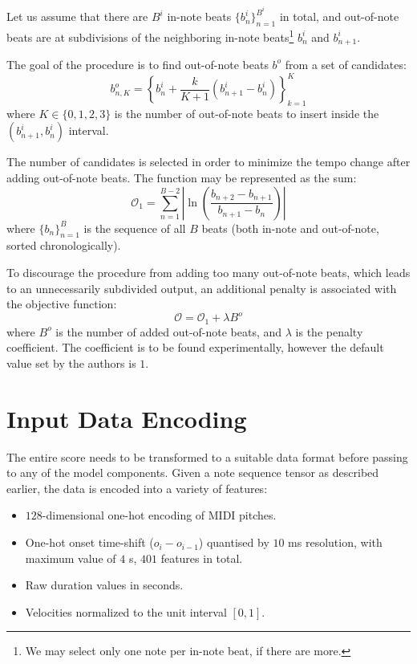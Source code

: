Let us assume that there are $B^i$ in-note beats $\{b_n^i\}_{n=1}^{B^i}$ in total, and out-of-note beats are at subdivisions of the neighboring in-note beats\footnote{We may select only one note per in-note beat, if there are more.} $b_{n}^i$ and $b_{n+1}^i$.

The goal of the procedure is to find out-of-note beats $b^o$ from a set of candidates: \begin{equation}\label{out_of_note_candidates}
b_{n,K}^o = \left\{b_n^i + \frac{k}{K+1}\left(b_{n+1}^i-b_n^i\right)\right\}_{k=1}^K
\end{equation} where $K\in\{0,1,2,3\}$ is the number of out-of-note beats to insert inside the $\left(b_{n+1}^i, b_n^i\right)$ interval.

The number of candidates is selected in order to minimize the tempo change after adding out-of-note beats. The function may be represented as the sum: \[\mathcal{O}_1 = \sum_{n=1}^{B-2}\left|\ln\left(\frac{b_{n+2} - b_{n+1}}{b_{n+1} - b_n}\right)\right|\] where $\{b_n\}_{n=1}^B$ is the sequence of all $B$ beats (both in-note and out-of-note, sorted chronologically).

To discourage the procedure from adding too many out-of-note beats, which leads to an unnecessarily subdivided output, an additional penalty is associated with the objective function: \begin{equation}\label{out_of_note_objective}
\mathcal{O} = \mathcal{O}_1 + \lambda B^o
\end{equation} where $B^o$ is the number of added out-of-note beats, and $\lambda$ is the penalty coefficient. The coefficient is to be found experimentally, however the default value set by the authors is $1$.



\section{Input Data Encoding}

The entire score needs to be transformed to a suitable data format before passing to any of the model components. Given a note sequence tensor as described earlier, the data is encoded into a variety of features: \begin{itemize}
	\item $128$-dimensional one-hot encoding of MIDI pitches.
	\item One-hot onset time-shift ($o_i - o_{i-1}$) quantised by $10$ ms resolution, with maximum value of $4$ s, $401$ features in total.
	\item Raw duration values in seconds.
	\item Velocities normalized to the unit interval $[0, 1]$.
\end{itemize}

